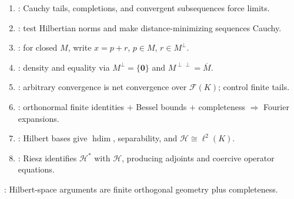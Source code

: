 \begin{method} \label{meth:hilbert-space-proof-patterns} 
\begin{enumerate}[label=(\roman*)]
\setlength{\itemsep}{0pt}
\item {}: Cauchy tails, completions, and convergent subsequences force limits.
\item {}: test Hilbertian norms and make distance-minimizing sequences Cauchy.
\item {}: for closed $M$, write $x=p+r$, $p\in M$, $r\in M^\perp$.
\item {}: density and equality via $M^\perp=\{\mathbf{0}\}$ and $M^{\perp\perp}=\overline{M}$.
\item {}: arbitrary convergence is net convergence over $\mathcal{F}(K)$; control finite tails.
\item {}: orthonormal finite identities $+$ Bessel bounds $+$ completeness $\Rightarrow$ Fourier expansions.
\item {}: Hilbert bases give $\operatorname{hdim}$, separability, and $\mathcal{H}\cong\ell^2(K)$.
\item {}: Riesz identifies $\mathcal{H}^*$ with $\mathcal{H}$, producing adjoints and coercive operator equations.
\end{enumerate}
: Hilbert-space arguments are finite orthogonal geometry plus completeness.
\end{method}
